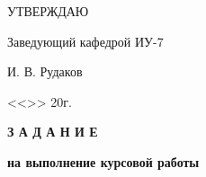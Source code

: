 \vspace*{-1.1cm}

\begin{flushright}
	\fontsize{12pt}{0.6cm}\selectfont
	УТВЕРЖДАЮ
	
	Заведующий кафедрой ИУ-7
	
	\uline{\mbox{\hspace{3cm}}} И. В. Рудаков
	
	<<\uline{\mbox{\hspace{1cm}}}>> \uline{\mbox{\hspace{3cm}}} 20\uline{\mbox{\hspace{1cm}}}г.
\end{flushright}

\begin{center}
	\fontsize{20pt}{14pt}\selectfont

	\textbf{З А Д А Н И Е}
	
	\textbf{на выполнение курсовой работы}
\end{center}



